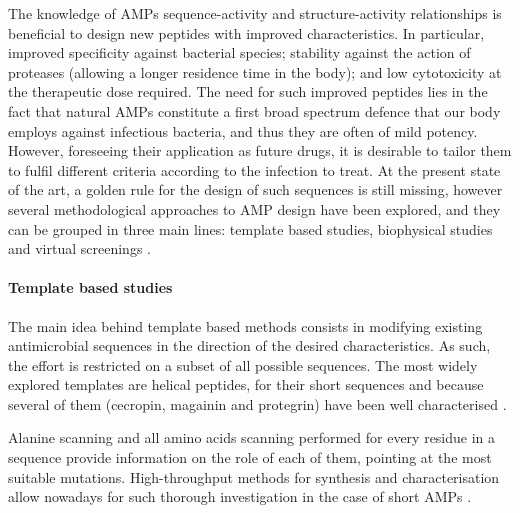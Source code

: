 The knowledge of AMPs sequence-activity and structure-activity relationships is beneficial to design new peptides with improved characteristics. In particular, improved specificity against bacterial species; stability against the action of proteases (allowing a longer residence time in the body); and low cytotoxicity at the therapeutic dose required.
The need for such improved peptides lies in the fact that natural AMPs constitute a first broad spectrum defence that our body employs against infectious bacteria, and thus they are often of mild potency. However, foreseeing their application as future drugs, it is desirable to tailor them to fulfil different criteria according to the infection to treat.
%
At the present state of the art, a golden rule for the design of such sequences is still missing, however several methodological approaches to AMP design have been explored, and they can be grouped in three main lines: template based studies, biophysical studies and virtual screenings \citep{Fjell2011}.

\paragraph{Template based studies}
The main idea behind template based methods consists in modifying existing antimicrobial sequences in the direction of the desired characteristics.
As such, the effort is restricted on a subset of all possible sequences.
%
The most widely explored templates are helical peptides, for their short sequences and because several of them (cecropin, magainin and protegrin) have been well characterised \citep{Wang2015}.

Alanine scanning \citep{Migon2018} and all amino acids scanning \citep{Hilpert2005} performed for every residue in a sequence provide information on the role of each of them, pointing at the most suitable mutations. High-throughput methods for synthesis and characterisation allow nowadays for such thorough investigation in the case of short AMPs \citep{Hilpert2005}.
%

